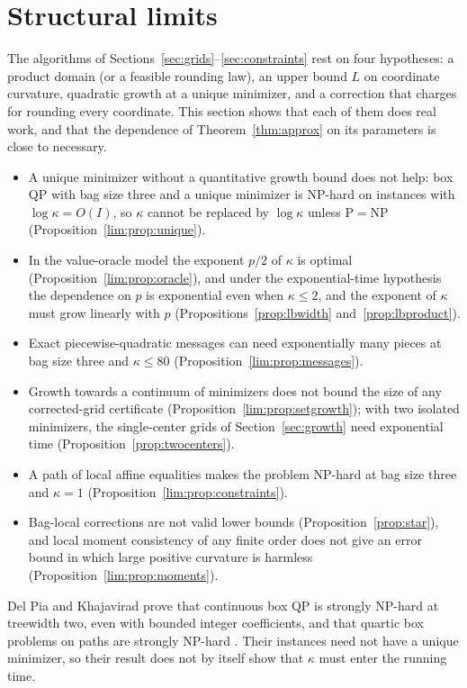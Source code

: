 \section{Structural limits}\label{sec:limits}

The algorithms of Sections~\ref{sec:grids}--\ref{sec:constraints} rest on
four hypotheses: a product domain (or a feasible rounding law), an upper
bound $L$ on coordinate curvature, quadratic growth at a unique minimizer,
and a correction that charges for rounding every coordinate. This section
shows that each of them does real work, and that the dependence of
Theorem~\ref{thm:approx} on its parameters is close to necessary.
\begin{itemize}
\item A unique minimizer without a quantitative growth bound does not help:
box QP with bag size three and a unique minimizer is NP-hard on instances
with $\log\kappa=O(I)$, so $\kappa$ cannot be replaced by $\log\kappa$ unless
P${}={}$NP (Proposition~\ref{lim:prop:unique}).
\item In the value-oracle model the exponent $p/2$ of $\kappa$ is optimal
(Proposition~\ref{lim:prop:oracle}), and under the exponential-time
hypothesis the dependence on $p$ is exponential even when $\kappa\le2$, and the exponent of $\kappa$ must grow linearly with $p$
(Propositions~\ref{prop:lbwidth} and~\ref{prop:lbproduct}).
\item Exact piecewise-quadratic messages can need exponentially many pieces
at bag size three and $\kappa\le80$ (Proposition~\ref{lim:prop:messages}).
\item Growth towards a continuum of minimizers does not bound the size of
any corrected-grid certificate (Proposition~\ref{lim:prop:setgrowth}); with
two isolated minimizers, the single-center grids of
Section~\ref{sec:growth} need exponential time
(Proposition~\ref{prop:twocenters}).
\item A path of local affine equalities makes the problem NP-hard at bag size
three and $\kappa=1$ (Proposition~\ref{lim:prop:constraints}).
\item Bag-local corrections are not valid lower bounds
(Proposition~\ref{prop:star}), and local moment consistency of any finite
order does not give an error bound in which large positive curvature is
harmless (Proposition~\ref{lim:prop:moments}).
\end{itemize}
Del Pia and Khajavirad prove that continuous box QP is strongly NP-hard at
treewidth two, even with bounded integer coefficients, and that quartic box
problems on paths are strongly NP-hard \cite{DelPiaKhajavirad2026}. Their
instances need not have a unique minimizer, so their result does not by
itself show that $\kappa$ must enter the running time.

